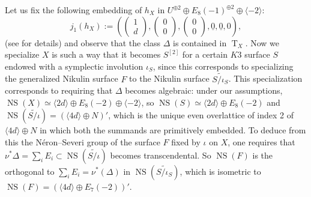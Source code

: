 \documentclass{amsart}
\theoremstyle{definition}
\numberwithin{equation}{section}
\numberwithin{equation}{section} \theoremstyle{definition}
\DeclareMathOperator{\NS}{NS}
\DeclareMathOperator{\T}{T}
\begin{document}
Let us fix the following embedding of $h_X$ in $U^{\oplus 2}\oplus E_8(-1)^{\oplus 2}\oplus\langle -2\rangle$:
\[
j_1(h_X):=\left(\left(\begin{array}{c}1\\d\end{array}\right),
\left(\begin{array}{c}0\\0\end{array}\right),
\left(\begin{array}{c}0\\0\end{array}\right),
\underline{0}, \underline{0},0\right),
\]
(see \cite[Proposition 2.5]{CGKK} for details) and observe that the class $\Delta$ is contained in $\T_X$.
Now we specialize $X$ is such a way that it becomes $S^{[2]}$ for a certain $K3$ surface $S$ endowed with a symplectic involution $\iota_S$, since this corresponds to specializing the generalized Nikulin surface $F$ to the Nikulin surface $\widetilde{S/\iota_S}$. This specialization corresponds to requiring that $\Delta$ becomes algebraic: under our assumptions, $\NS(X)\simeq \langle 2d\rangle\oplus E_8(-2)\oplus \langle -2\rangle$, so $\NS(S)\simeq \langle 2d\rangle\oplus E_8(-2)$ and $\NS(\widetilde{S/\iota})=(\langle 4d\rangle\oplus N)'$, which is the unique even overlattice of index 2 of $\langle 4d\rangle\oplus N$ in which both the summands are primitively embedded. %
To deduce from this the N\'eron--Severi group of the surface $F$ fixed by $\iota$ on $X$, one requires that $\nu^*\Delta=\sum_i E_i\subset \NS(\widetilde{S/\iota})$ becomes transcendental.
So $\NS(F)$ is the orthogonal to $\sum_iE_i=\nu^*(\Delta)$ in $\NS(\widetilde{S/\iota_S})$, which is isometric to $\NS(F)=(\langle 4d\rangle\oplus E_7(-2))'$. 
\end{document}
